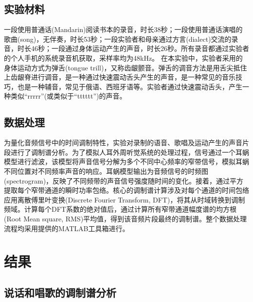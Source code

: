 \documentclass[jou,12pt,floatsintext]{apa7} %
\begin{document}
\subsection{\heiti 实验材料}

一段使用普通话(Mandarin)阅读书本的录音，时长38秒；一段使用普通话演唱的歌曲(song)，无伴奏，时长53秒；一段实验者和母亲通过方言(dialect)交流的录音，时长46秒；一段通过身体运动产生的声音，时长26秒。所有录音都通过实验者的个人手机的系统录音机获取，采样率均为48kHz。
在本实验中，实验者采用的身体运动方式为弹舌(tongue trill)，又称齿龈颤音。弹舌的调音方法是用舌尖抵住上齿龈脊进行调音，是一种通过快速震动舌头产生的声音，是一种常见的音乐技巧，也是一种辅音，常见于俄语、西班牙语等。实验者通过快速震动舌头，产生一种类似``rrrrr''(或类似于``tttttt'')的声音。

\subsection{\heiti 数据处理}

为量化音频信号中的时间调制特性，实验对录制的语音、歌唱及运动产生的声音片段进行了调制谱分析\parencite{ding2017temporal}。为了模拟人耳外周听觉系统的处理过程，信号通过一个耳蜗模型进行滤波，该模型将声音信号分解为多个不同中心频率的窄带信号，模拟耳蜗不同位置对不同频率声音的响应。耳蜗模型输出为音频信号的时频图(spectrogram)，反映了不同频带的声音信号强度随时间的变化。接着，通过平方提取每个窄带通道的瞬时功率包络。核心的调制谱计算涉及对每个通道的时间包络应用离散傅里叶变换(Discrete Fourier Transform, DFT)，将其从时域转换到调制频域。计算每个DFT系数的绝对值后，通过计算所有窄带通道幅度谱的均方根(Root Mean square, RMS)平均值，得到该音频片段最终的调制谱。整个数据处理流程均采用\textcite{ding2017temporal}提供的MATLAB工具箱进行。

\section{结果}

\subsection{\heiti 说话和唱歌的调制谱分析}
\end{document}

